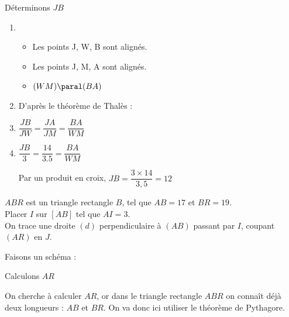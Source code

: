 \documentclass[../Cours.tex]{subfiles}
\begin{document}
\begin{questions}
\question Déterminons $JB$

\begin{enumerate}
    \item 
    \begin{itemize}
        \item Les points J, W, B sont alignés.
        \item Les points J, M, A sont alignés.
        \item $(WM) \paral (BA)$
    \end{itemize}
    \item D'après le théorème de Thalès :
    \item $\dfrac{JB}{JW} = \dfrac{JA}{JM} = \dfrac{BA}{WM}$
    \item $\dfrac{JB}{3} = \dfrac{14}{\num{3.5}} = \dfrac{BA}{WM}$

    Par un produit en croix, $JB = \dfrac{3 \times 14}{3,5} = 12$
\end{enumerate}


$ABR$ est un triangle rectangle $B$, tel que $AB = 17$ et $BR = 19$. \\
Placer $I$ sur $[AB]$ tel que $AI=3$. \\
On trace une droite $(d)$ perpendiculaire à $(AB)$ passant par $I$, coupant $(AR)$ en $J$.

Faisons un schéma : 

\begin{center}
\end{center}

\clearpage
\question Calculons $AR$

On cherche à calculer $AR$, or dans le triangle rectangle $ABR$ on connaît déjà deux longueurs : $AB$ et $BR$. On va donc ici utiliser le théorème de Pythagore.


\end{questions}
\end{document}
